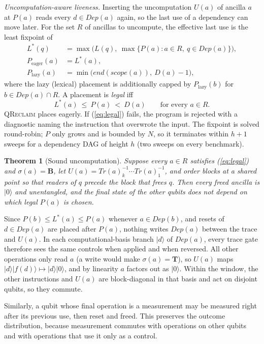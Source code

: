 \documentclass[conference,a4paper]{IEEEtran}
\newtheorem{theorem}{Theorem}
\newcommand{\QR}{\textup{\textsc{QReclaim}}}
\newcommand{\Dep}{\mathit{Dep}}
\newcommand{\Tr}{\mathit{Tr}}
\newcommand{\Lst}{L^{*}}
\begin{document}
\emph{Uncomputation-aware liveness.} Inserting the uncomputation $U(a)$ of ancilla $a$ at $P(a)$ reads every $d\in\Dep(a)$ again, so the last use of a dependency can move later. For the set $R$ of ancillas to uncompute, the effective last use is the least fixpoint of
\begin{align}
\Lst(q) &= \max\big(L(q),\ \max\{P(a): a\in R,\ q\in\Dep(a)\}\big),\label{eq:lstar}\\
P_{\mathrm{eager}}(a) &= \Lst(a),\label{eq:place}\\
P_{\mathrm{lazy}}(a) &= \min\big(\mathit{end}(\mathit{scope}(a)),\ D(a){-}1\big),\nonumber
\end{align}
where the lazy (lexical) placement is additionally capped by $P_{\mathrm{lazy}}(b)$ for $b\in\Dep(a)\cap R$. A placement is \emph{legal} iff
\begin{equation}
\Lst(a)\ \le\ P(a)\ <\ D(a)\qquad\text{for every } a\in R. \label{eq:legal}
\end{equation}
\QR{} places eagerly. If (\ref{eq:legal}) fails, the program is rejected with a diagnostic naming the instruction that overwrote the input. The fixpoint is solved round-robin; $P$ only grows and is bounded by $N$, so it terminates within $h{+}1$ sweeps for a dependency DAG of height $h$ (two sweeps on every benchmark).

\begin{theorem}[Sound uncomputation]\label{thm:sound}
Suppose every $a\in R$ satisfies (\ref{eq:legal}) and $\sigma(a)=\mathbf{B}$, let $U(a)=\Tr(a)_k^{-1}\cdots\Tr(a)_1^{-1}$, and order blocks at a shared point so that readers of $q$ precede the block that frees $q$. Then every freed ancilla is $|0\rangle$ and unentangled, and the final state of the other qubits does not depend on which legal $P(a)$ is chosen.
\end{theorem}
\begin{IEEEproof}
Since $P(b)\le\Lst(a)\le P(a)$ whenever $a\in\Dep(b)$, and resets of $d\in\Dep(a)$ are placed after $P(a)$, nothing writes $\Dep(a)$ between the trace and $U(a)$. In each computational-basis branch $|d\rangle$ of $\Dep(a)$, every trace gate therefore sees the same controls when applied and when reversed. All other operations only read $a$ (a write would make $\sigma(a)=\mathbf{T}$), so $U(a)$ maps $|d\rangle|f(d)\rangle\mapsto|d\rangle|0\rangle$, and by linearity $a$ factors out as $|0\rangle$. Within the window, the other instructions and $U(a)$ are block-diagonal in that basis and act on disjoint qubits, so they commute.
\end{IEEEproof}
Similarly, a qubit whose final operation is a measurement may be measured right after its previous use, then reset and freed. This preserves the outcome distribution, because measurement commutes with operations on other qubits and with operations that use it only as a control.
\end{document}
